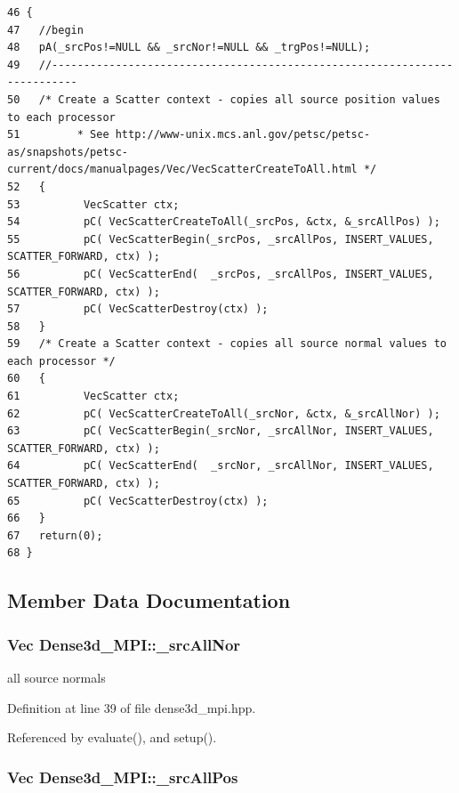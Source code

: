 \footnotesize\begin{verbatim}46 {
47   //begin
48   pA(_srcPos!=NULL && _srcNor!=NULL && _trgPos!=NULL);
49   //--------------------------------------------------------------------------
50   /* Create a Scatter context - copies all source position values to each processor
51         * See http://www-unix.mcs.anl.gov/petsc/petsc-as/snapshots/petsc-current/docs/manualpages/Vec/VecScatterCreateToAll.html */
52   {
53          VecScatter ctx;
54          pC( VecScatterCreateToAll(_srcPos, &ctx, &_srcAllPos) );
55          pC( VecScatterBegin(_srcPos, _srcAllPos, INSERT_VALUES, SCATTER_FORWARD, ctx) );
56          pC( VecScatterEnd(  _srcPos, _srcAllPos, INSERT_VALUES, SCATTER_FORWARD, ctx) );
57          pC( VecScatterDestroy(ctx) );
58   }
59   /* Create a Scatter context - copies all source normal values to each processor */
60   {
61          VecScatter ctx;
62          pC( VecScatterCreateToAll(_srcNor, &ctx, &_srcAllNor) );
63          pC( VecScatterBegin(_srcNor, _srcAllNor, INSERT_VALUES, SCATTER_FORWARD, ctx) );
64          pC( VecScatterEnd(  _srcNor, _srcAllNor, INSERT_VALUES, SCATTER_FORWARD, ctx) );
65          pC( VecScatterDestroy(ctx) );
66   }
67   return(0);
68 }
\end{verbatim}\normalsize 




\subsection{Member Data Documentation}
\subsubsection{\setlength{\rightskip}{0pt plus 5cm}Vec {\bf Dense3d\_\-MPI::\_\-src\-All\-Nor}\hspace{0.3cm}{\tt  [protected]}}\label{classDense3d__MPI_db2ec95209a80ecf4e75545dbe1bd00d_db2ec95209a80ecf4e75545dbe1bd00d}


all source normals 

Definition at line 39 of file dense3d\_\-mpi.hpp.

Referenced by evaluate(), and setup().
\subsubsection{\setlength{\rightskip}{0pt plus 5cm}Vec {\bf Dense3d\_\-MPI::\_\-src\-All\-Pos}\hspace{0.3cm}{\tt  [protected]}}\label{classDense3d__MPI_864bdce428c7c15d43e08e6733357f13_864bdce428c7c15d43e08e6733357f13}


